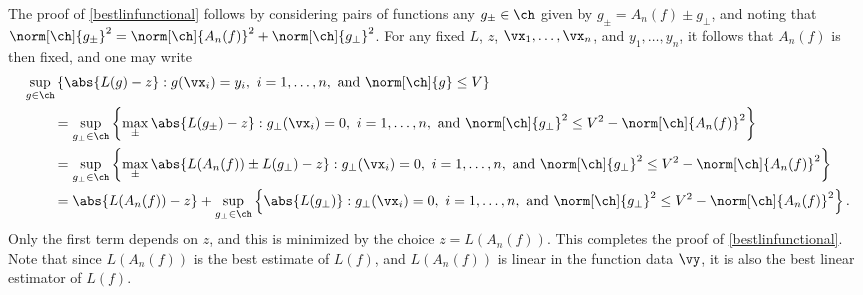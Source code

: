 \documentclass[11pt]{amsart}
\theoremstyle{definition}
\begin{document}
The proof of \eqref{bestlinfunctional} follows by considering pairs of functions any $g_{\pm} \in \ch$ given by $g_{\pm} = A_n(f) \pm g_{\perp}$, and noting that $\norm[\ch]{g_{\pm}}^2 = \norm[\ch]{A_n(f)}^2 + \norm[\ch]{g_{\perp}}^2$.  For any fixed $L$, $z$, $\vx_1, \ldots, \vx_n$, and $y_1, \ldots, y_n$, it follows that $A_n(f)$ is then fixed, and one may write
\begin{align*}
\MoveEqLeft{\sup_{g \in \ch } \left \{ \abs{L(g) - z} : g(\vx_i) = y_i,\ i=1, \ldots, n, \text{ and } \norm[\ch]{g} \le V \right \}}\\
&= \sup_{g_\perp\in\ch}\left\{ \max_{\pm} \abs{L(g_{\pm}) - z} : g_\perp(\vx_i) = 0,\ i=1, \ldots, n, \text{ and }  \norm[\ch]{g_{\perp}}^2 \le V^2 - \norm[\ch]{A_n(f)}^2 \right\} \\
&= \sup_{g_\perp\in\ch}\left\{ \max_{\pm} \abs{L(A_n(f)) \pm L(g_{\perp}) - z} : g_\perp(\vx_i) = 0,\ i=1, \ldots, n, \text{ and }  \norm[\ch]{g_{\perp}}^2 \le V^2 - \norm[\ch]{A_n(f)}^2 \right\} \\
&= \abs{L(A_n(f)) - z} + \sup_{g_\perp\in\ch}\left\{ \abs{L(g_{\perp})} : g_\perp(\vx_i) = 0,\ i=1, \ldots, n, \text{ and }  \norm[\ch]{g_{\perp}}^2 \le V^2 - \norm[\ch]{A_n(f)}^2 \right\}.
\end{align*}
Only the first term depends on $z$, and this is minimized by the choice $z=L(A_n(f))$.  This completes the proof of \eqref{bestlinfunctional}.  Note that since $L(A_n(f))$ is the best estimate of $L(f)$, and $L(A_n(f))$ is linear in the function data $\vy$, it is also the best linear estimator of $L(f)$.
\end{document}
